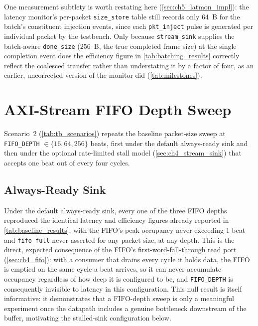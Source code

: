 One measurement subtlety is worth restating here (\autoref{sec:ch5_latmon_impl}): the latency monitor's per-packet \texttt{size\_store} table still records only 64~B for the batch's constituent injection events, since each \texttt{pkt\_inject} pulse is generated per individual packet by the testbench. Only because \texttt{stream\_sink} supplies the batch-aware \texttt{done\_size} (256~B, the true completed frame size) at the single completion event does the efficiency figure in \autoref{tab:batching_results} correctly reflect the coalesced transfer rather than understating it by a factor of four, as an earlier, uncorrected version of the monitor did (\autoref{tab:milestones}).


\section{AXI-Stream FIFO Depth Sweep}
\label{sec:ch7_fifo}

Scenario~2 (\autoref{tab:tb_scenarios}) repeats the baseline packet-size sweep at \texttt{FIFO\_DEPTH} $\in \{16, 64, 256\}$ beats, first under the default always-ready sink and then under the optional rate-limited stall model (\autoref{sec:ch4_stream_sink}) that accepts one beat out of every four cycles.

\subsection{Always-Ready Sink}
\label{sec:ch7_fifo_always_ready}

Under the default always-ready sink, every one of the three FIFO depths reproduced the identical latency and efficiency figures already reported in \autoref{tab:baseline_results}, with the FIFO's peak occupancy never exceeding 1 beat and \texttt{fifo\_full} never asserted for any packet size, at any depth. This is the direct, expected consequence of the FIFO's first-word-fall-through read port (\autoref{sec:ch4_fifo}): with a consumer that drains every cycle it holds data, the FIFO is emptied on the same cycle a beat arrives, so it can never accumulate occupancy regardless of how deep it is configured to be, and \texttt{FIFO\_DEPTH} is consequently invisible to latency in this configuration. This null result is itself informative: it demonstrates that a FIFO-depth sweep is only a meaningful experiment once the datapath includes a genuine bottleneck downstream of the buffer, motivating the stalled-sink configuration below.

